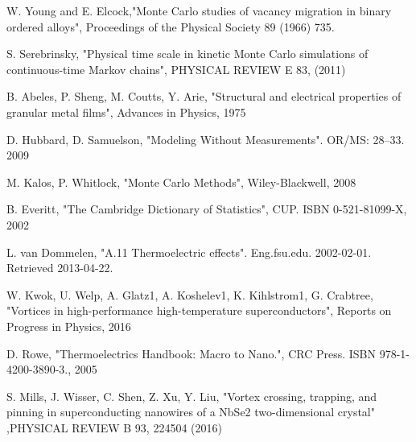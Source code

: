 \begin{thebibliography}{10}
 W. Young and E. Elcock,"Monte Carlo studies of vacancy migration in binary ordered alloys", Proceedings of the Physical Society 89 (1966) 735.

 S. Serebrinsky, "Physical time scale in kinetic Monte Carlo simulations of continuous-time Markov chains", PHYSICAL REVIEW E 83, (2011)

 B. Abeles, P. Sheng, M. Coutts, Y. Arie, "Structural and electrical properties of granular metal films", Advances in Physics, 1975

 D. Hubbard, D. Samuelson, "Modeling Without Measurements". OR/MS: 28–33. 2009

 M. Kalos, P. Whitlock, "Monte Carlo Methods", Wiley-Blackwell, 2008

 B. Everitt, "The Cambridge Dictionary of Statistics", CUP. ISBN 0-521-81099-X, 2002

 L. van Dommelen, "A.11 Thermoelectric effects". Eng.fsu.edu. 2002-02-01. Retrieved 2013-04-22.

 W. Kwok, U. Welp, A. Glatz1, A. Koshelev1, K. Kihlstrom1, G. Crabtree, "Vortices in high-performance high-temperature superconductors", Reports on Progress in Physics, 2016

 D. Rowe, "Thermoelectrics Handbook: Macro to Nano.", CRC Press. ISBN 978-1-4200-3890-3., 2005

 S. Mills, J. Wisser, C. Shen, Z. Xu, Y. Liu, "Vortex crossing, trapping, and pinning in superconducting nanowires of a NbSe2 two-dimensional crystal" ,PHYSICAL REVIEW B 93, 224504 (2016)

\end{thebibliography}

